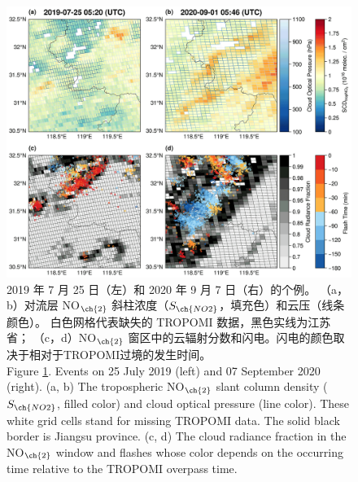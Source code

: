 \begin{figure}[H]
    \centering
    \includegraphics[width=\textwidth]{./figures/china_flash_scd.png}
    \caption{
    2019 年 7 月 25 日（左）和 2020 年 9 月 7 日（右）的个例。
    （a，b）对流层 NO$_{\ch{2}}$ 斜柱浓度（$S_{\ch{NO2}}$，填充色）和云压（线条颜色）。
    白色网格代表缺失的 TROPOMI 数据，黑色实线为江苏省；
    （c，d）NO$_{\ch{2}}$ 窗区中的云辐射分数和闪电。闪电的颜色取决于相对于TROPOMI过境的发生时间。\\
    Figure \ref{fig:china_flash_scd}. Events on 25 July 2019 (left) and 07 September 2020 (right).
    (a, b) The tropospheric NO$_{\ch{2}}$ slant column density ($S_{\ch{NO2}}$, filled color) and cloud optical pressure (line color).
    These white grid cells stand for missing TROPOMI data.
    The solid black border is Jiangsu province.
    (c, d) The cloud radiance fraction in the NO$_{\ch{2}}$ window and flashes whose color depends on the occurring time relative to the TROPOMI overpass time.
    }
    \label{fig:china_flash_scd}
\end{figure}


